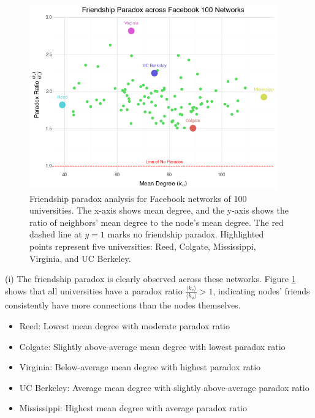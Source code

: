 \documentclass[12pt]{article}
\begin{document}
\begin{figure}[t]
    \centering
    \includegraphics[width=0.95\textwidth]{../figures/paradox_ratio_plot.png}
    \caption{Friendship paradox analysis for Facebook networks of 100 universities. The x-axis shows mean degree, and the y-axis shows the ratio of neighbors' mean degree to the node's mean degree. The red dashed line at $y=1$ marks no friendship paradox. Highlighted points represent five universities: Reed, Colgate, Mississippi, Virginia, and UC Berkeley.}
    \label{fig:scatterplot_friendship_paradox}
\end{figure}

(i) The friendship paradox is clearly observed across these networks. Figure \ref{fig:scatterplot_friendship_paradox} shows that all universities have a paradox ratio $\frac{\langle k_v \rangle}{\langle k_u \rangle} > 1$, indicating nodes' friends consistently have more connections than the nodes themselves. 

\begin{itemize}
    \item Reed: Lowest mean degree with moderate paradox ratio
    \item Colgate: Slightly above-average mean degree with lowest paradox ratio
    \item Virginia: Below-average mean degree with highest paradox ratio
    \item UC Berkeley: Average mean degree with slightly above-average paradox ratio
    \item Mississippi: Highest mean degree with average paradox ratio
\end{itemize}
\end{document}
